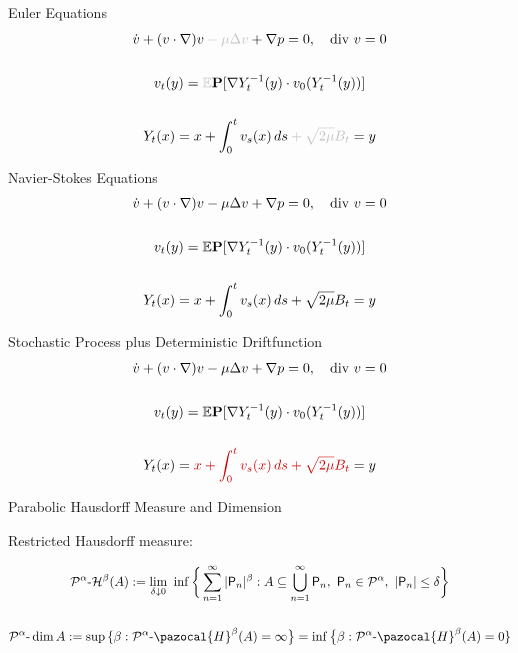 \documentclass{beamer}
\theoremstyle{plain}
\theoremstyle{definition}
\theoremstyle{remark}
\newcommand{\1}{\mathbbm{1}}
\newcommand{\m}{\text{-}}
\begin{document}
\begin{frame}{Euler Equations}
\begin{gather*}
\dot{v}+(v\cdot \nabla)v \color{lightgray} - \mu \Delta v \color{black} + \nabla p = 0,  \quad \text{div} \ v = 0\\
\quad\\
v_t(y) = \color{lightgray} \mathbb{E} \color{black} \textbf{P}[ \nabla Y_t^{-1}(y) \cdot v_0(Y_t^{-1}(y))]\\
\quad \\
Y_t(x) = x + \int_0^t v_s(x) \, ds  \color{lightgray} + \sqrt{2\mu} B_t \color{black} = y
\end{gather*}
\end{frame}



\begin{frame}{Navier-Stokes Equations}
\begin{gather*}
\dot{v}+(v\cdot \nabla)v - \mu \Delta v + \nabla p = 0,  \quad \text{div} \ v = 0 \\
\quad\\
v_t(y) = \mathbb{E} \textbf{P}[ \nabla Y_t^{-1}(y) \cdot v_0(Y_t^{-1}(y))]\\
\quad \\
Y_t(x) = x + \int_0^t v_s(x) \, ds  + \sqrt{2\mu} B_t \color{black} = y
\end{gather*}
\end{frame}


\begin{frame}{Stochastic Process plus Deterministic Driftfunction}
\begin{gather*}
\dot{v}+(v\cdot \nabla)v - \mu \Delta v + \nabla p = 0,  \quad \text{div} \ v = 0 \\
\quad\\
v_t(y) = \mathbb{E} \textbf{P}[ \nabla Y_t^{-1}(y) \cdot v_0(Y_t^{-1}(y))]\\
\quad \\
Y_t(x) = \color{offred}{x + \int_0^t v_s(x) \, ds  + \sqrt{2\mu} B_t} \color{black} = y
\end{gather*}
\end{frame}


\begin{frame}{Parabolic Hausdorff Measure and Dimension}

\begin{center}
Restricted Hausdorff measure:
\end{center}

\begin{gather*}
\mathcal{P}^\alpha\m \mathcal{H}^\beta(A) := \lim_{\delta \downarrow 0}\ \inf \bigg\{\sum_{n=1}^\infty |\mathsf{P}_n|^\beta: A\subseteq\bigcup_{n=1}^\infty \mathsf{P}_n,\ \mathsf{P}_n \in \mathcal{P}^\alpha,\ |\mathsf{P}_n|\leq \delta \bigg\} \\
\quad\\
\mathcal{P}^\alpha\m\dim A := \sup\, \{\beta : \mathcal{P}^\alpha\m\pazocal{H}^\beta(A) = \infty \big\} =  \inf \big\{\beta : \mathcal{P}^\alpha\m\pazocal{H}^\beta(A) =0\}
\end{gather*}

\end{frame}
\end{document}
